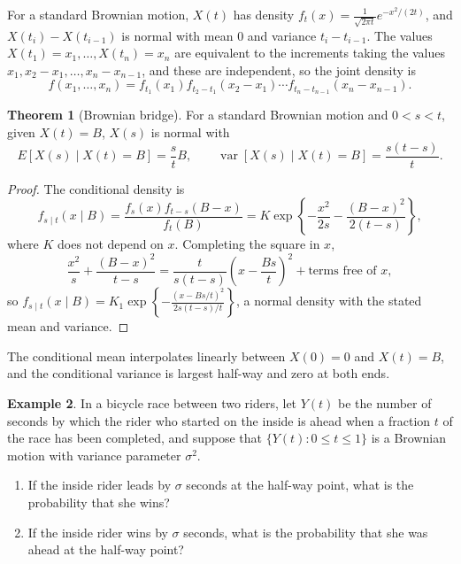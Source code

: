\documentclass[12pt,a4paper]{report}
\theoremstyle{definition}
\newtheorem{thm}{Theorem}[section]
\newtheorem{exa}[thm]{Example}
\DeclareMathOperator{\var}{var}
\begin{document}
For a standard Brownian motion, $X(t)$ has density $f_t(x) = \frac{1}{\sqrt{2\pi t}}e^{-x^2/(2t)}$, and
$X(t_i) - X(t_{i-1})$ is normal with mean $0$ and variance $t_i - t_{i-1}$. The values
$X(t_1) = x_1, \dots, X(t_n) = x_n$ are equivalent to the increments taking the values
$x_1, x_2 - x_1, \dots, x_n - x_{n-1}$, and these are independent, so the joint density is
\[f(x_1, \dots, x_n) = f_{t_1}(x_1)f_{t_2 - t_1}(x_2 - x_1)\cdots f_{t_n - t_{n-1}}(x_n - x_{n-1}) .\]

\begin{thm}[Brownian bridge]
\label{thm:bridge}
For a standard Brownian motion and $0<s<t$, given $X(t) = B$, $X(s)$ is normal with
\[E\left[X(s)\mid X(t) = B\right] = \frac stB,\qquad \var\left[X(s)\mid X(t) = B\right] = \frac{s(t - s)}{t} .\]
\end{thm}

\begin{proof}
The conditional density is
\[f_{s\mid t}(x\mid B) = \frac{f_s(x)f_{t-s}(B - x)}{f_t(B)} = K\exp\left\{-\frac{x^2}{2s} - \frac{(B - x)^2}{2(t - s)}\right\},\]
where $K$ does not depend on $x$. Completing the square in $x$,
\[\frac{x^2}{s} + \frac{(B - x)^2}{t - s} = \frac{t}{s(t - s)}\left(x - \frac{Bs}{t}\right)^2 + \text{terms free of } x,\]
so $f_{s\mid t}(x\mid B) = K_1\exp\left\{-\frac{(x - Bs/t)^2}{2s(t - s)/t}\right\}$, a normal density with the
stated mean and variance.
\end{proof}

The conditional mean interpolates linearly between $X(0) = 0$ and $X(t) = B$, and the conditional
variance is largest half-way and zero at both ends.

\begin{exa}
\label{ex:bicycle}
In a bicycle race between two riders, let $Y(t)$ be the number of seconds by which the rider who
started on the inside is ahead when a fraction $t$ of the race has been completed, and suppose that
$\{Y(t) : 0\leq t\leq 1\}$ is a Brownian motion with variance parameter $\sigma^2$.
\begin{enumerate}
\item[(a)] If the inside rider leads by $\sigma$ seconds at the half-way point, what is the
probability that she wins?
\item[(b)] If the inside rider wins by $\sigma$ seconds, what is the probability that she was ahead
at the half-way point?
\end{enumerate}
\end{exa}
\end{document}
